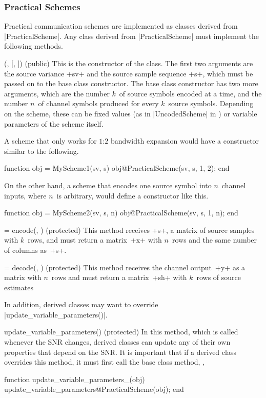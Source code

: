 \subsubsection{Practical Schemes}

Practical communication schemes are implemented as classes derived from
|PracticalScheme|. Any class derived from |PracticalScheme| must implement the
following methods.
\begin{method}{(, 
  [, ]) (public)}
  This is the constructor of the class. The first two arguments are the source
  variance +sv+ and the source sample sequence +s+, which must be passed on to
  the base class constructor. The base class constructor has two more arguments,
  which are the number $k$~of source symbols encoded at a time, and the number
  $n$~of channel symbols produced for every $k$~source symbols.
  Depending on the scheme, these can be fixed values (as in |UncodedScheme| in
  ) or variable parameters of the scheme itself.

  \codeexample A scheme that only works for $1$:$2$ bandwidth expansion would
  have a constructor similar to the following.
  \begin{Code}
  function obj = MyScheme1(sv, s)
    obj@PracticalScheme(sv, s, 1, 2);
  end
  \end{Code}
  On the other hand, a scheme that encodes one source symbol into $n$~channel
  inputs, where $n$~is arbitrary, would define a constructor like this.
  \begin{Code}
  function obj = MyScheme2(sv, s, n)
    obj@PracticalScheme(sv, s, 1, n);
  end
  \end{Code}
\end{method}

\begin{method}{ = encode(\obj, ) (protected)}
  This method receives +s+, a matrix of source samples with $k$~rows, and must
  return a matrix~+x+ with $n$~rows and the same number of columns as~+s+.
\end{method}

\begin{method}{ = decode(\obj, ) (protected)}
  This method receives the channel output~+y+ as a matrix with $n$~rows and
  must return a matrix~+sh+ with $k$~rows of source estimates
\end{method}

In addition, derived classes may want to override
|update_variable_parameters()|.
\begin{method}{update_variable_parameters(\obj) (protected)}
  In this method, which is called whenever the SNR changes, derived classes can
  update any of their own properties that depend on the SNR. It
  is important that if a derived class overrides this method, it must first
  call the base class method, \ie,
  \begin{Code}
  function update_variable_parameters_(obj)
    update_variable_parameters@PracticalScheme(obj); 
  end
  \end{Code}
\end{method}

